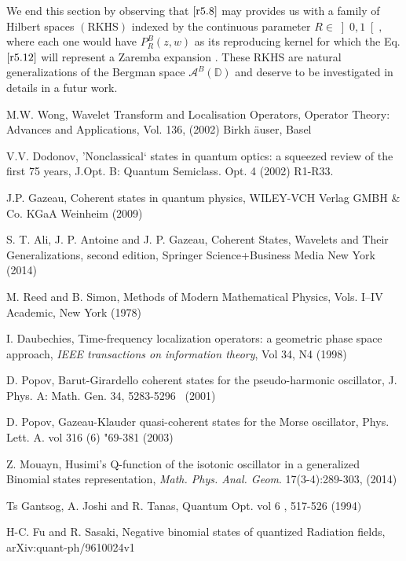 \smallskip

We end this section by observing that $\eqref{r5.8} $ may provides us
with a family of Hilbert spaces $\left( \text{RKHS}\right) $ indexed by the
continuous parameter $R\in \left] 0,1\right[ ,$ where each one would have $%
P_{R}^{B}(z,w)$ as its reproducing kernel for which the Eq. $\eqref{r5.12} $ will represent a Zaremba expansion \cite{SFH}. These
RKHS are natural generalizations of the Bergman space $\mathcal{A}^{B}(%
\mathbb{D})$ and deserve to be investigated in details in a futur work.


\begin{thebibliography}{99}

  M.W. Wong, Wavelet Transform and Localisation
Operators, Operator Theory: Advances and Applications, Vol. 136, (2002) Birkh%
\"{a}user, Basel

 V.V. Dodonov, 'Nonclassical` states in quantum optics: a
squeezed review of the first 75 years, J.Opt. B: Quantum Semiclass. Opt. 4
(2002) R1-R33.

 J.P. Gazeau, Coherent states in quantum physics, WILEY-VCH
Verlag GMBH \& Co. KGaA Weinheim (2009)

 S. T. Ali, J. P. Antoine and J. P. Gazeau, Coherent States,
Wavelets and Their Generalizations, second edition, Springer
Science+Business Media New York (2014)

 M. Reed and B. Simon, Methods of Modern Mathematical Physics,
Vols. I--IV Academic, New York (1978)

 I. Daubechies, Time-frequency localization operators: a
geometric phase space approach, \textit{IEEE transactions on information
theory}, Vol 34, N4 (1998)

 D. Popov, Barut-Girardello coherent states for the
pseudo-harmonic oscillator, J. Phys. A: Math. Gen. 34, 5283-5296 \ (2001)

 D. Popov, Gazeau-Klauder quasi-coherent states for the Morse
oscillator, Phys. Lett. A. vol 316 (6) "69-381 (2003)

 Z. Mouayn, Husimi's Q-function of the isotonic oscillator in a
generalized Binomial states representation, \textit{Math. Phys. Anal. Geom}.
17(3-4):289-303, (2014)

 Ts Gantsog, A. Joshi and R. Tanas, Quantum Opt. vol 6 , 517-526
(1994$)$

 H-C. Fu and R. Sasaki, Negative binomial states of quantized
Radiation fields, arXiv:quant-ph/9610024v1


\end{thebibliography}
